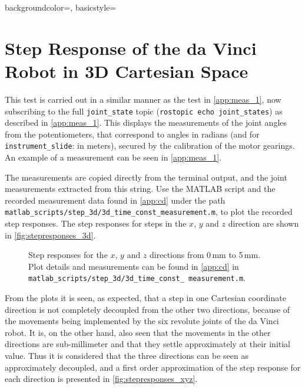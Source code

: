 {
    backgroundcolor=\color{white},
    basicstyle=\scriptsize\color{black}\ttfamily
}
\vspace{10mm}
\section{Step Response of the da Vinci Robot in 3D Cartesian Space}\label{sec:step_3d}
This test is carried out in a similar manner as the test in \autoref{app:meas_1}, now subscribing to the full \texttt{joint\_state} topic (\texttt{rostopic echo joint\_states}) as described in \autoref{app:meas_1}. This displays the measurements of the joint angles from the potentiometers, that correspond to angles in radians (and for \texttt{instrument\_slide}: in meters), secured by the calibration of the motor gearings. An example of a measurement can be seen in \autoref{app:meas_1}.

The measurements are copied directly from the terminal output, and the joint measurements extracted from this string. Use the MATLAB script and the recorded measurement data found in \autoref{app:cd} under the path \texttt{matlab\_scripts/step\_3d/3d\_time\_const\_measurement.m}, to plot the recorded step responses. The step responses for steps in the $x$, $y$ and $z$ direction are shown in \autoref{fig:stepresponses_3d}.

\begin{figure}[h]
\hspace{-13mm}
%
%
%
\caption{Step responses for the $x$, $y$ and $z$ directions from 0\,mm to 5\,mm. Plot details and measurements can be found in \autoref{app:cd} in \texttt{matlab\_scripts/step\_3d/3d\_time\_const\_ measurement.m}.}
\label{fig:stepresponses_3d}
\end{figure}

\vspace{-0.3cm}
From the plots it is seen, as expected, that a step in one Cartesian coordinate direction is not completely decoupled from the other two directions, because of the movements being implemented by the six revolute joints of the da Vinci robot. It is, on the other hand, also seen that the movements in the other directions are sub-millimeter and that they settle approximately at their initial value. Thus it is considered that the three directions can be seen as approximately decoupled, and a first order approximation of the step response for each direction is presented in \autoref{fig:stepresponses_xyz}.

